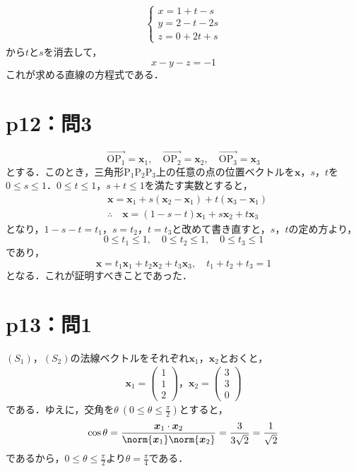 \begin{tanswer}
  \begin{align*}
    \begin{cases}
      x=1+t-s   \\
      y=2-t -2s \\
      z=0+2t+s
    \end{cases}
  \end{align*}
  から$t$と$s$を消去して，
  \[
    x-y-z=-1
  \]
  これが求める直線の方程式である．
\end{tanswer}

\section*{p12：問3}

\begin{tproof}
  \[
    \overrightarrow{\mathrm{OP_1}}=\bm{x}_1,\quad \overrightarrow{\mathrm{OP_2}}=\bm{x}_2,\quad \overrightarrow{\mathrm{OP_3}}=\bm{x}_3
  \]
  とする．このとき，三角形$\mathrm{P_1 P_2 P_3}$上の任意の点の位置ベクトルを$\bm{x}$，$s$，$t$を$0 \le s \le 1$．$ 0 \le t \le 1$，$ s+ t \le 1$を満たす実数とすると，
  \begin{align*}
     & \bm{x}=\bm{x}_1 + s(\bm{x}_2 - \bm{x}_1) + t (\bm{x}_3 - \bm{x}_1) \\
     & \therefore \quad \bm{x} = (1-s-t)\bm{x}_1 + s\bm{x}_2 + t \bm{x}_3
  \end{align*}
  となり，$1-s-t=t_1$，$s=t_2$，$t=t_3$と改めて書き直すと，$s$，$t$の定め方より，
  \[
    0 \le t_1 \le 1 ,\quad 0 \le t_2 \le 1 ,\quad 0 \le t_3 \le 1
  \]
  であり，
  \[
    \bm{x} = t_1\bm{x}_1 + t_2\bm{x}_2 + t_3 \bm{x}_3,\quad t_1+t_2+t_3=1
  \]
  となる．これが証明すべきことであった．
\end{tproof}
%

%
\section*{p13：問1}
%
\begin{tanswer}
  $(S_1)$，$(S_2)$の法線ベクトルをそれぞれ$\bm{x}_1$，$\bm{x}_2$とおくと，
  \begin{gather*}
    \bm{x}_1 =
    \begin{pmatrix}
      1 \\
      1 \\
      2
    \end{pmatrix}
    ，
    \bm{x}_2 =
    \begin{pmatrix}
      3 \\
      3 \\
      0
    \end{pmatrix}
  \end{gather*}
  である．ゆえに，交角を$\theta ~(0 \le \theta \le \frac{\pi}{2})$とすると，
  \[
    \cos \theta = \frac{\bm{x}_1 \cdot \bm{x}_2}{\norm{\bm{x}_1} \norm{\bm{x}_2}}=\frac{3}{3\sqrt{2}}=\frac{1}{\sqrt{2}}
  \]
  であるから，$0 \le \theta \le \frac{\pi}{2}$より$\theta =\frac{\pi}{4}$である．
\end{tanswer}
%
